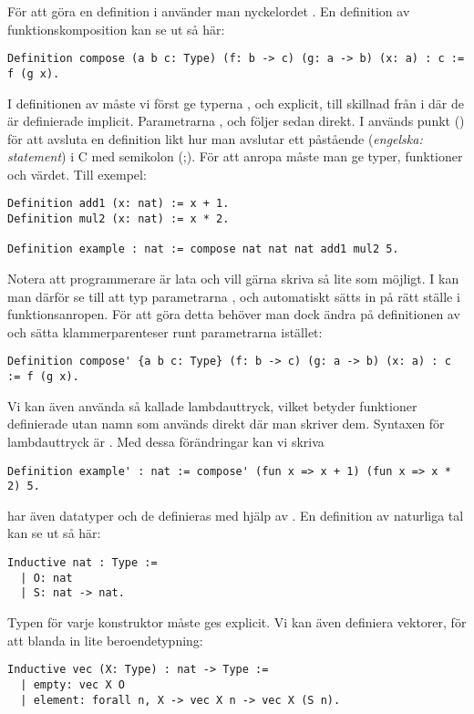 För att göra en definition i \coq{} använder man nyckelordet . En
definition av funktionskomposition kan se ut så här:
\begin{lstlisting}
Definition compose (a b c: Type) (f: b -> c) (g: a -> b) (x: a) : c := f (g x).
\end{lstlisting}
I definitionen av  måste vi först ge typerna ,  och 
explicit, till skillnad från i \haskell{} där de är definierade implicit.
Parametrarna ,  och  följer sedan direkt. I \coq{} används punkt
() för att avsluta en definition likt hur man avslutar ett påstående
(\emph{engelska: statement}) i C med semikolon (;). För att anropa 
måste man ge typer, funktioner och värdet. Till exempel:
\begin{lstlisting}
Definition add1 (x: nat) := x + 1.
Definition mul2 (x: nat) := x * 2.

Definition example : nat := compose nat nat nat add1 mul2 5.
\end{lstlisting}
Notera att programmerare är lata och vill gärna skriva så lite som möjligt. I
\coq{} kan man därför se till att typ parametrarna ,  och 
automatiskt sätts in på rätt ställe i funktionsanropen. För att göra detta
behöver man dock ändra på definitionen av  och sätta
klammerparenteser runt parametrarna istället:
\begin{lstlisting}
Definition compose' {a b c: Type} (f: b -> c) (g: a -> b) (x: a) : c := f (g x).
\end{lstlisting}
Vi kan även använda så kallade lambdauttryck, vilket betyder funktioner
definierade utan namn som används direkt där man skriver dem. Syntaxen för
lambdauttryck är . Med dessa förändringar kan
vi skriva
\begin{lstlisting}
Definition example' : nat := compose' (fun x => x + 1) (fun x => x * 2) 5.
\end{lstlisting}
\coq{} har även datatyper och de definieras med hjälp av . En
definition av naturliga tal kan se ut så här:
\begin{lstlisting}
Inductive nat : Type :=
  | O: nat
  | S: nat -> nat.
\end{lstlisting}
Typen för varje konstruktor måste ges explicit. Vi kan även definiera vektorer, för
att blanda in lite beroendetypning:
\begin{lstlisting}
Inductive vec (X: Type) : nat -> Type :=
  | empty: vec X O
  | element: forall n, X -> vec X n -> vec X (S n).
\end{lstlisting}
